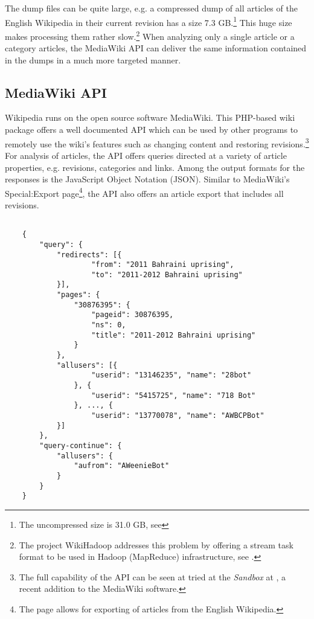 The dump files can be quite large, e.g. a compressed dump of all articles of the English Wikipedia in their current revision has a size 7.3 GB.\footnote{The uncompressed size is 31.0 GB, see }
This huge size makes processing them rather slow.\footnote{The project WikiHadoop addresses this problem by offering a stream task format to be used in Hadoop (MapReduce) infrastructure, see .}
When analyzing only a single article or a category articles, the MediaWiki API can deliver the same information contained in the dumps in a much more targeted manner. 

\subsection{MediaWiki API}\label{sub:mediawikiapi}

Wikipedia runs on the open source software MediaWiki.
This PHP-based wiki package offers a well documented API which can be used by other programs to remotely use the wiki's features such as changing content and restoring revisions.\footnote{The full capability of the API can be seen at tried at the \emph{Sandbox} at , a recent addition to the MediaWiki software.}
For analysis of articles, the API offers queries directed at a variety of article properties, e.g. revisions, categories and links.
Among the output formats for the responses is the JavaScript Object Notation (JSON).
Similar to MediaWiki's Special:Export page\footnote{The page  allows for exporting of articles from the English Wikipedia.}, the API also offers an article export that includes all revisions.
\begin{lstlisting}

	{
		"query": {
			"redirects": [{
					"from": "2011 Bahraini uprising",
					"to": "2011-2012 Bahraini uprising"
			}],
			"pages": {
				"30876395": {
					"pageid": 30876395,
					"ns": 0,
					"title": "2011-2012 Bahraini uprising"
				}
			},
			"allusers": [{
					"userid": "13146235", "name": "28bot"
				}, {
					"userid": "5415725", "name": "718 Bot"
				}, ..., {
					"userid": "13770078", "name": "AWBCPBot"
			}]
		},
		"query-continue": {
			"allusers": {
				"aufrom": "AWeenieBot"
			}
		}
	}
\end{lstlisting}

